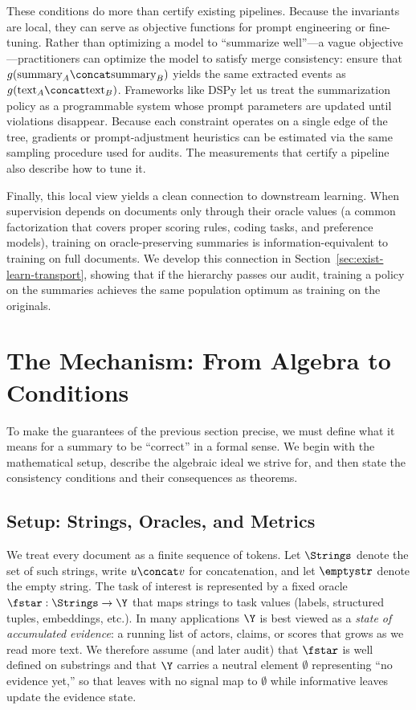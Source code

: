 These conditions do more than certify existing pipelines. Because the invariants are local, they can serve as objective functions for prompt engineering or fine-tuning. Rather than optimizing a model to ``summarize well''---a vague objective---practitioners can optimize the model to satisfy merge consistency: ensure that $g(\text{summary}_A \concat \text{summary}_B)$ yields the same extracted events as $g(\text{text}_A \concat \text{text}_B)$. Frameworks like DSPy \citep{khattab2024dspy} let us treat the summarization policy as a programmable system whose prompt parameters are updated until violations disappear. Because each constraint operates on a single edge of the tree, gradients or prompt-adjustment heuristics can be estimated via the same sampling procedure used for audits. The measurements that certify a pipeline also describe how to tune it.

Finally, this local view yields a clean connection to downstream learning. When supervision depends on documents only through their oracle values (a common factorization that covers proper scoring rules, coding tasks, and preference models), training on oracle-preserving summaries is information-equivalent to training on full documents. We develop this connection in Section~\ref{sec:exist-learn-transport}, showing that if the hierarchy passes our audit, training a policy on the summaries achieves the same population optimum as training on the originals.


\section{The Mechanism: From Algebra to Conditions}\label{sec:mechanism}

To make the guarantees of the previous section precise, we must define what it means for a summary to be ``correct'' in a formal sense. We begin with the mathematical setup, describe the algebraic ideal we strive for, and then state the consistency conditions and their consequences as theorems.

\subsection{Setup: Strings, Oracles, and Metrics}

We treat every document as a finite sequence of tokens. Let $\Strings$ denote the set of such strings, write $u \concat v$ for concatenation, and let $\emptystr$ denote the empty string. The task of interest is represented by a fixed oracle $\fstar: \Strings \to \Y$ that maps strings to task values (labels, structured tuples, embeddings, etc.). In many applications $\Y$ is best viewed as a \emph{state of accumulated evidence}: a running list of actors, claims, or scores that grows as we read more text. We therefore assume (and later audit) that $\fstar$ is well defined on substrings and that $\Y$ carries a neutral element $\emptyset$ representing ``no evidence yet,'' so that leaves with no signal map to $\emptyset$ while informative leaves update the evidence state.

